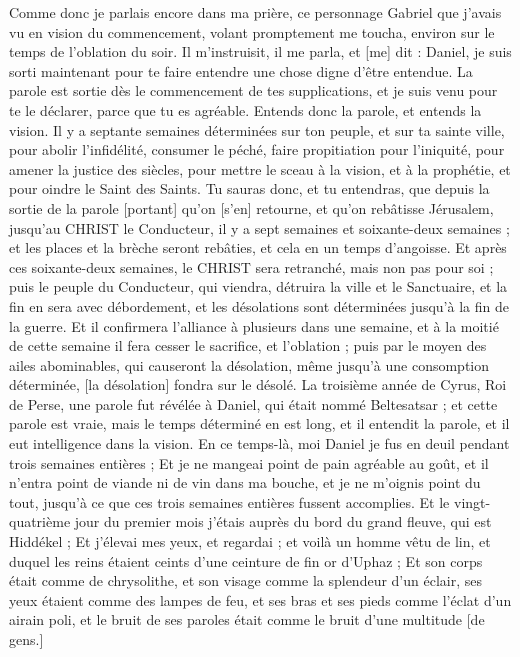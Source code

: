 \begin{multicols}{2}
Comme donc je parlais encore dans ma prière, ce personnage Gabriel que j'avais vu en vision du commencement, volant promptement me toucha, environ sur le temps de l'oblation du soir.
Il m'instruisit, il me parla, et [me] dit : Daniel, je suis sorti maintenant pour te faire entendre une chose digne d'être entendue.
La parole est sortie dès le commencement de tes supplications, et je suis venu pour te le déclarer, parce que tu es agréable. Entends donc la parole, et entends la vision.
Il y a septante semaines déterminées sur ton peuple, et sur ta sainte ville, pour abolir l'infidélité, consumer le péché, faire propitiation pour l'iniquité, pour amener la justice des siècles, pour mettre le sceau à la vision, et à la prophétie, et pour oindre le Saint des Saints.
Tu sauras donc, et tu entendras, que depuis la sortie de la parole [portant] qu'on [s'en] retourne, et qu'on rebâtisse Jérusalem, jusqu'au CHRIST le Conducteur, il y a sept semaines et soixante-deux semaines ; et les places et la brèche seront rebâties, et cela en un temps d'angoisse.
Et après ces soixante-deux semaines, le CHRIST sera retranché, mais non pas pour soi ; puis le peuple du Conducteur, qui viendra, détruira la ville et le Sanctuaire, et la fin en sera avec débordement, et les désolations sont déterminées jusqu'à la fin de la guerre.
Et il confirmera l'alliance à plusieurs dans une semaine, et à la moitié de cette semaine il fera cesser le sacrifice, et l'oblation ; puis par le moyen des ailes abominables, qui causeront la désolation, même jusqu'à une consomption déterminée, [la désolation] fondra sur le désolé.
\VerseOne{}La troisième année de Cyrus, Roi de Perse, une parole fut révélée à Daniel, qui était nommé Beltesatsar ; et cette parole est vraie, mais le temps déterminé en est long, et il entendit la parole, et il eut intelligence dans la vision.
En ce temps-là, moi Daniel je fus en deuil pendant trois semaines entières ;
Et je ne mangeai point de pain agréable au goût, et il n'entra point de viande ni de vin dans ma bouche, et je ne m'oignis point du tout, jusqu'à ce que ces trois semaines entières fussent accomplies.
Et le vingt-quatrième jour du premier mois j'étais auprès du bord du grand fleuve, qui est Hiddékel ;
Et j'élevai mes yeux, et regardai ; et voilà un homme vêtu de lin, et duquel les reins étaient ceints d'une ceinture de fin or d'Uphaz ;
Et son corps était comme de chrysolithe, et son visage comme la splendeur d'un éclair, ses yeux étaient comme des lampes de feu, et ses bras et ses pieds comme l'éclat d'un airain poli, et le bruit de ses paroles était comme le bruit d'une multitude [de gens.]

\end{multicols}
